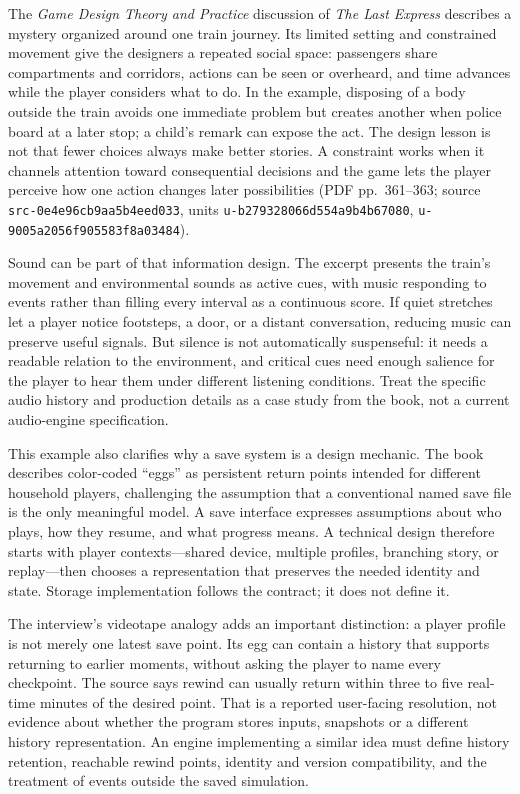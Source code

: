 The \emph{Game Design Theory and Practice} discussion of \emph{The Last Express} describes a mystery organized around one train journey. Its limited setting and constrained movement give the designers a repeated social space: passengers share compartments and corridors, actions can be seen or overheard, and time advances while the player considers what to do. In the example, disposing of a body outside the train avoids one immediate problem but creates another when police board at a later stop; a child's remark can expose the act. The design lesson is not that fewer choices always make better stories. A constraint works when it channels attention toward consequential decisions and the game lets the player perceive how one action changes later possibilities (PDF pp.~361--363; source \texttt{src-0e4e96cb9aa5b4eed033}, units \texttt{u-b279328066d554a9b4b67080}, \texttt{u-9005a2056f905583f8a03484}).

Sound can be part of that information design. The excerpt presents the train's movement and environmental sounds as active cues, with music responding to events rather than filling every interval as a continuous score. If quiet stretches let a player notice footsteps, a door, or a distant conversation, reducing music can preserve useful signals. But silence is not automatically suspenseful: it needs a readable relation to the environment, and critical cues need enough salience for the player to hear them under different listening conditions. Treat the specific audio history and production details as a case study from the book, not a current audio-engine specification.

This example also clarifies why a save system is a design mechanic. The book describes color-coded ``eggs'' as persistent return points intended for different household players, challenging the assumption that a conventional named save file is the only meaningful model. A save interface expresses assumptions about who plays, how they resume, and what progress means. A technical design therefore starts with player contexts---shared device, multiple profiles, branching story, or replay---then chooses a representation that preserves the needed identity and state. Storage implementation follows the contract; it does not define it.

The interview's videotape analogy adds an important distinction: a player profile is not merely one latest save point. Its egg can contain a history that supports returning to earlier moments, without asking the player to name every checkpoint. The source says rewind can usually return within three to five real-time minutes of the desired point. That is a reported user-facing resolution, not evidence about whether the program stores inputs, snapshots or a different history representation. An engine implementing a similar idea must define history retention, reachable rewind points, identity and version compatibility, and the treatment of events outside the saved simulation.

